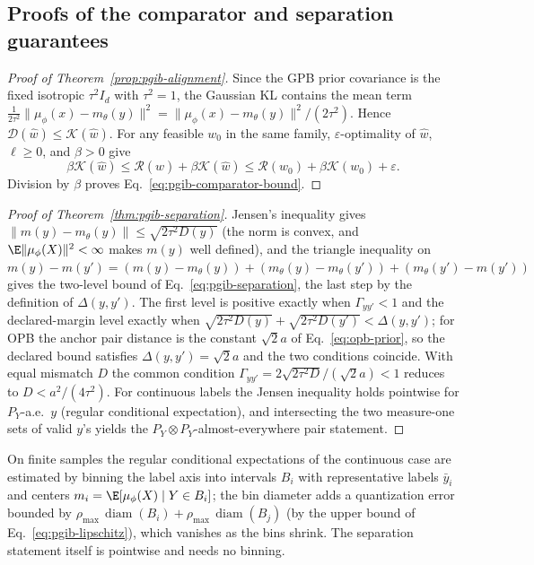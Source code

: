 \subsection{Proofs of the comparator and separation guarantees}

\begin{proof}[Proof of Theorem~\ref{prop:pgib-alignment}]
Since the GPB prior covariance is the fixed isotropic $\tau^2I_d$ with
$\tau^2=1$, the Gaussian KL contains the mean term
$\frac1{2\tau^2}\|\mu_\phi(x)-m_\theta(y)\|^2
=\|\mu_\phi(x)-m_\theta(y)\|^2/(2\tau^2)$. Hence
$\mathcal D(\widehat w)\le\mathcal K(\widehat w)$. For any feasible $w_0$ in the
same family, $\varepsilon$-optimality of $\widehat w$, $\ell\ge0$, and $\beta>0$
give
\begin{equation*}
\beta\mathcal K(\widehat w)
\le \mathcal R(\widehat w)+\beta\mathcal K(\widehat w)
\le \mathcal R(w_0)+\beta\mathcal K(w_0)+\varepsilon.
\end{equation*}
Division by $\beta$ proves Eq.~\eqref{eq:pgib-comparator-bound}.
\end{proof}

\begin{proof}[Proof of Theorem~\ref{thm:pgib-separation}]
Jensen's inequality gives
$\|m(y) - m_\theta(y)\| \le \sqrt{2\tau^2 D(y)}$
(the norm is convex, and $\E\|\mu_\phi(X)\|^2<\infty$ makes $m(y)$ well defined),
and the triangle inequality on
$m(y) - m(y') = (m(y) - m_\theta(y)) + (m_\theta(y) - m_\theta(y'))
+ (m_\theta(y') - m(y'))$ gives the two-level bound of
Eq.~\eqref{eq:pgib-separation}, the last step
by the definition of $\Delta(y,y')$. The first level is positive exactly
when $\Gamma_{yy'}<1$ and the declared-margin level exactly when
$\sqrt{2\tau^2D(y)}+\sqrt{2\tau^2D(y')}<\Delta(y,y')$; for OPB the
anchor pair distance is the constant $\sqrt2a$ of
Eq.~\eqref{eq:opb-prior}, so the declared bound satisfies $\Delta(y,y')=\sqrt2a$ and
the two conditions coincide. With equal mismatch $D$ the common condition
$\Gamma_{yy'}=2\sqrt{2\tau^2D}/(\sqrt2a)<1$ reduces to
$D<a^2/(4\tau^2)$. For continuous labels the Jensen inequality holds
pointwise for $P_Y$-a.e.\ $y$ (regular conditional expectation), and intersecting
the two measure-one sets of valid $y$'s yields the $P_Y\otimes P_Y$-almost-everywhere
pair statement.
\end{proof}

\begin{remark}
\label{rem:pgib-binning}
On finite samples the regular conditional expectations of the continuous case are
estimated by
binning the label axis into intervals $B_i$ with representative labels $\bar y_i$
and centers $m_i = \E[\mu_\phi(X) \mid Y \in B_i]$; the bin diameter adds a
quantization error bounded by
$\rho_{\max}\,\operatorname{diam}(B_i) + \rho_{\max}\,\operatorname{diam}(B_j)$ (by
the upper bound of Eq.~\eqref{eq:pgib-lipschitz}), which vanishes as the bins
shrink. The separation statement itself is pointwise and needs no binning.
\end{remark}

